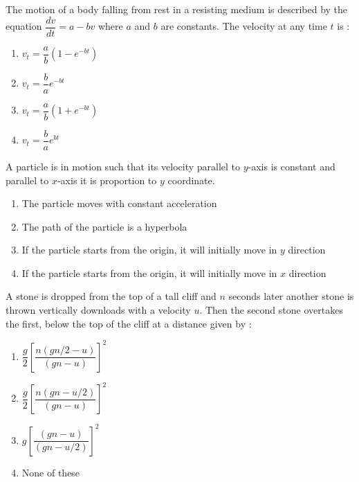 \item The motion of a body falling from rest in a resisting medium is described by the equation $\dfrac{dv}{dt} = a -bv$ where $a$ and $b$ are constants. The velocity at any time $t$ is :
\begin{multicols}{4}
\begin{enumerate}
\item $v_t=\dfrac{a}{b}\left(1-e^{-bt}\right)$
\item $v_t=\dfrac{b}{a}e^{-bt}$
\item $v_t=\dfrac{a}{b}\left(1+e^{-bt}\right)$
\item $v_t=\dfrac{b}{a}e^{bt}$
\end{enumerate}
\end{multicols}

\item A particle is in motion such that its velocity parallel to $y$-axis is constant and parallel to $x$-axis it is proportion to $y$ coordinate.
\begin{enumerate}
\item The particle moves with constant acceleration
\item The path of the particle is a hyperbola
\item If the particle starts from the origin, it will initially move in $y$ direction
\item If the particle starts from the origin, it will initially move in $x$ direction
\end{enumerate}



\item A stone is dropped from the top of a tall cliff and $n$ seconds later another stone is thrown vertically downloads with a velocity $u$. Then the second stone overtakes the first, below the top of the cliff at a distance given by :
\begin{multicols}{4}
\begin{enumerate}
\item $\dfrac{g}{2}\left[\dfrac{n(gn/2-u)}{(gn-u)}\right]^2$
\item $\dfrac{g}{2}\left[\dfrac{n(gn-u/2)}{(gn-u)}\right]^2$
\item $g\left[\dfrac{(gn-u)}{(gn-u/2)}\right]^2$
\item None of these
\end{enumerate}
\end{multicols}